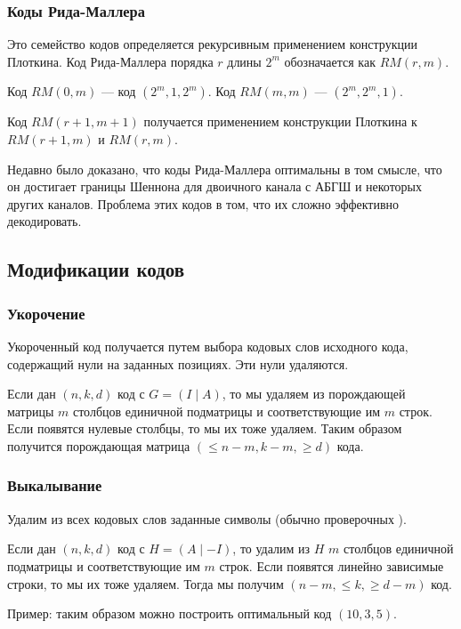 \subsubsection{Коды Рида-Маллера}

Это семейство кодов определяется рекурсивным применением конструкции Плоткина.
Код Рида-Маллера порядка \(r\) длины \(2^m\) обозначается как \(RM(r, m)\).

Код \(RM(0, m)\) --- код \((2^m, 1, 2^m)\). Код \(RM(m,m)\) --- \((2^m, 2^m, 1)\).

Код \(RM(r + 1, m + 1)\) получается применением конструкции Плоткина к
\(RM(r + 1, m)\) и \(RM(r, m)\).

Недавно было доказано, что коды Рида-Маллера оптимальны в том смысле, что он достигает границы Шеннона для двоичного канала с АБГШ и некоторых других каналов.
Проблема этих кодов в том, что их сложно эффективно декодировать.

\subsection{Модификации кодов}

\subsubsection{Укорочение}

Укороченный код получается путем выбора кодовых слов исходного кода,
содержащий нули на заданных позициях. Эти нули удаляются.

Если дан \((n, k, d)\) код с \(G = (I \mid A)\),
то мы удаляем из порождающей матрицы \(m\) столбцов единичной подматрицы и соответствующие им \(m\) строк.
Если появятся нулевые столбцы, то мы их тоже удаляем.
Таким образом получится порождающая матрица \((\leq n - m, k - m, \geq d)\) кода.

\subsubsection{Выкалывание}

Удалим из всех кодовых слов заданные символы (обычно проверочных \?).

Если дан \((n, k, d)\) код с \(H = (A \mid - I)\),
то удалим из \(H\) \(m\) столбцов единичной подматрицы и соответствующие им \(m\) строк.
Если появятся линейно зависимые строки, то мы их тоже удаляем.
Тогда мы получим \((n - m, \leq k, \geq d - m)\) код.

Пример: таким образом можно построить оптимальный код \((10, 3, 5)\).


